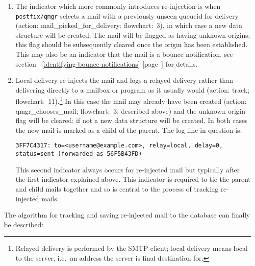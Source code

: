 \documentclass[a4paper,12pt,draft]{article}
\newcommand{\refwithpage}[1]{%
    \empty{}\ref{#1} [page~\pageref{#1}]%
}
\begin{document}
\begin{enumerate}

    \item The indicator which more commonly introduces re-injection is when
        \texttt{postfix/qmgr} selects a mail with a previously unseen
        queueid for delivery (action: mail\_picked\_for\_delivery;
        flowchart:~3), in which case a new data structure will be created.
        The mail will be flagged as having unknown origins; this flag
        should be subsequently cleared once the origin has been
        established.  This may also be an indicator that the mail is a
        bounce notification, see
        section~\refwithpage{identifying-bounce-notifications} for details.

    \item Local delivery re-injects the mail and logs a relayed delivery
        rather than delivering directly to a mailbox or program as it
        usually would (action: track; flowchart:~11).\footnote{Relayed
        delivery is performed by the SMTP client; local delivery means
        local to the server, i.e.\ an address the server is final
        destination for.} In this case the mail may already have been
        created (action: qmgr\_chooses\_mail; flowchart:~3; described
        above) and the unknown origin flag will be cleared; if not a new
        data structure will be created.  In both cases the new mail is
        marked as a child of the parent.  The log line in question is:

        \texttt{3FF7C4317: to=<username@example.com>, relay=local, \newline 
        delay=0, status=sent (forwarded as 56F5B43FD)}

        This second indicator always occurs for re-injected mail but
        typically after the first indicator explained above.  This
        indicator is required to tie the parent and child mails together
        and so is central to the process of tracking re-injected mails.

\end{enumerate}

The algorithm for tracking and saving re-injected mail to the database can
finally be described:
\end{document}
